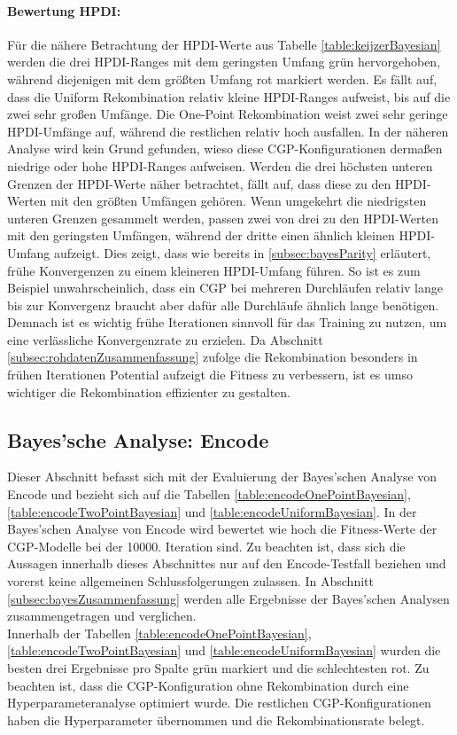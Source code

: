 \paragraph{Bewertung HPDI:}
Für die nähere Betrachtung der HPDI-Werte aus Tabelle \ref{table:keijzerBayesian} werden die drei HPDI-Ranges mit dem geringsten Umfang grün hervorgehoben, während diejenigen mit dem größten Umfang rot markiert werden.
Es fällt auf, dass die Uniform Rekombination relativ kleine HPDI-Ranges aufweist, bis auf die zwei sehr großen Umfänge.
Die One-Point Rekombination weist zwei sehr geringe HPDI-Umfänge auf, während die restlichen relativ hoch ausfallen.
In der näheren Analyse wird kein Grund gefunden, wieso diese CGP-Konfigurationen dermaßen niedrige oder hohe HPDI-Ranges aufweisen. 
Werden die drei höchsten unteren Grenzen der HPDI-Werte näher betrachtet, fällt auf, dass diese zu den HPDI-Werten mit den größten Umfängen gehören.
Wenn umgekehrt die niedrigsten unteren Grenzen gesammelt werden, passen zwei von drei zu den HPDI-Werten mit den geringsten Umfängen, während der dritte einen ähnlich kleinen HPDI-Umfang aufzeigt.
Dies zeigt, dass wie bereits in \ref{subsec:bayesParity} erläutert, frühe Konvergenzen zu einem kleineren HPDI-Umfang führen.
So ist es zum Beispiel unwahrscheinlich, dass ein CGP bei mehreren Durchläufen relativ lange bis zur Konvergenz braucht aber dafür alle Durchläufe ähnlich lange benötigen.
Demnach ist es wichtig frühe Iterationen sinnvoll für das Training zu nutzen, um eine verlässliche Konvergenzrate zu erzielen.
Da Abschnitt \ref{subsec:rohdatenZusammenfassung} zufolge die Rekombination besonders in frühen Iterationen Potential aufzeigt die Fitness zu verbessern, ist es umso wichtiger die Rekombination effizienter zu gestalten.


\subsection{Bayes'sche Analyse: Encode}
\label{subsec:bayesEncode}

Dieser Abschnitt befasst sich mit der Evaluierung der Bayes'schen Analyse von Encode und bezieht sich auf die Tabellen \ref{table:encodeOnePointBayesian}, \ref{table:encodeTwoPointBayesian} und \ref{table:encodeUniformBayesian}.
In der Bayes'schen Analyse von Encode wird bewertet wie hoch die Fitness-Werte der CGP-Modelle bei der 10000. Iteration sind.
Zu beachten ist, dass sich die Aussagen innerhalb dieses Abschnittes nur auf den Encode-Testfall beziehen und vorerst keine allgemeinen Schlussfolgerungen zulassen.
In Abschnitt \ref{subsec:bayesZusammenfassung} werden alle Ergebnisse der Bayes'schen Analysen zusammengetragen und verglichen.\\
Innerhalb der Tabellen \ref{table:encodeOnePointBayesian}, \ref{table:encodeTwoPointBayesian} und \ref{table:encodeUniformBayesian} wurden die besten drei Ergebnisse pro Spalte grün markiert und die schlechtesten rot.
Zu beachten ist, dass die CGP-Konfiguration ohne Rekombination durch eine Hyperparameteranalyse optimiert wurde.
Die restlichen CGP-Konfigurationen haben die Hyperparameter übernommen und die Rekombinationsrate belegt.
